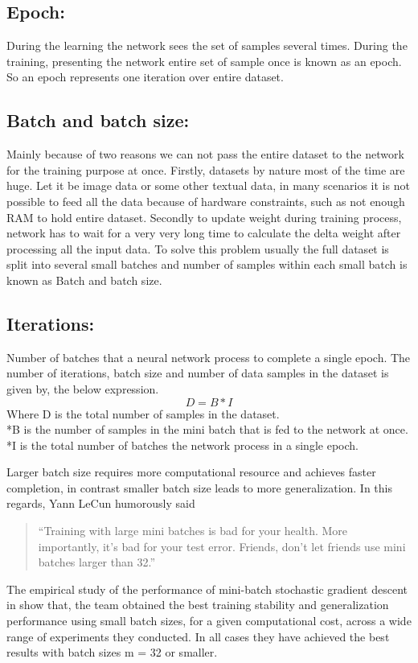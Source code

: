 \subsection{Epoch:}
During the learning the network sees the set of samples several times. During the training, presenting the network entire set of sample once is known as an epoch. So an epoch represents one iteration over entire dataset.
\subsection{Batch and batch size:}
Mainly because of two reasons we can not pass the entire dataset to the network for the training purpose at once. Firstly, datasets by nature most of the time are huge. Let it be image data or some other textual data, in many scenarios it is not possible to feed all the data because of hardware constraints, such as not enough RAM to hold entire dataset.
Secondly to update weight during training process, network has to wait for a very very long time to calculate the delta weight after processing all the input data. To solve this problem usually the full dataset is split into several small batches and number of samples within each small batch is known as 
Batch and batch size.
\subsection{Iterations:} 
Number of batches that a neural network process to complete a single epoch.
The number of  iterations, batch size and  number of data samples in the dataset is given by, the below expression.
\begin{equation}
    D = B * I
\end{equation}
Where D is the total number of samples in the dataset.
\\*B is the number of samples in the mini batch that is fed to the network at once.
\\*I is the  total number of batches the network process in a single epoch.

Larger batch size requires more computational resource and achieves faster completion, in contrast smaller batch size leads to more generalization. In this regards, Yann  LeCun humorously said
\begin{quote}
``Training with large mini batches is bad for your health. More importantly, it's bad for your test error.  Friends, don't let friends use mini batches larger than 32.''
\end{quote}   
The empirical study of the performance of mini-batch stochastic gradient descent in \cite{masters2018revisiting} show that, the team obtained the best training stability and generalization performance using small batch sizes, for a given computational cost, across a wide range of experiments they conducted. In all cases they have achieved the best results with batch sizes m = 32 or smaller.
